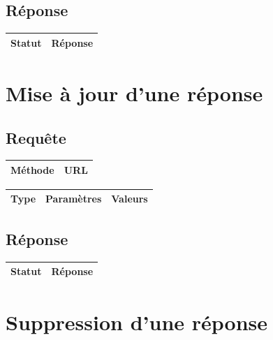 \documentclass[titlepage]{report}
\begin{document}
\section{Réponse}

\begin{center}
	\begin{tabular}{|c|c|}
		\hline
		Statut & Réponse \\
		\hline
		
	\end{tabular}
\end{center}

\chapter{Mise à jour d'une réponse}

\section{Requête}

\begin{center}
	\begin{tabular}{|c|c|}
		\hline
		Méthode & URL \\
		\hline
		
	\end{tabular}
\end{center}


\begin{center}
	\begin{tabular}{|c|c|c|}
		\hline
		Type & Paramètres & Valeurs \\
		\hline
		
	\end{tabular}
\end{center}


\section{Réponse}

\begin{center}
	\begin{tabular}{|c|c|}
		\hline
		Statut & Réponse \\
		\hline
		
	\end{tabular}
\end{center}


\chapter{Suppression d'une réponse}
\end{document}
